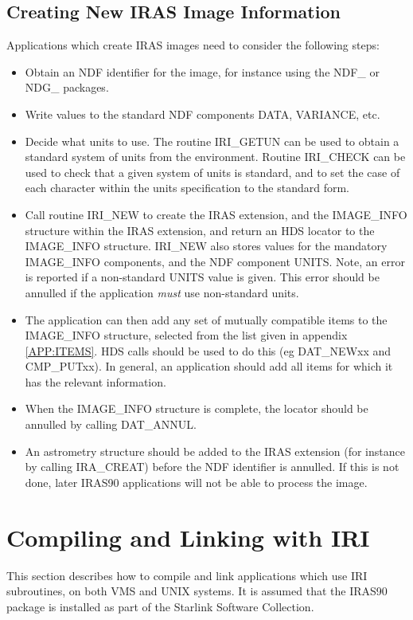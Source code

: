 \subsection{Creating New IRAS Image Information}
Applications which create IRAS images need to consider the following
steps:
\begin{itemize}

\item Obtain an NDF identifier for the image, for instance using the NDF\_ or
NDG\_ packages.

\item Write values to the standard NDF components DATA, VARIANCE, etc.

\item Decide what units to use. The routine IRI\_GETUN can be used to obtain a
standard system of units from the environment. Routine IRI\_CHECK can be used to
check that a given system of units is standard, and to set the case of each
character within the units specification to the standard form.

\item Call routine IRI\_NEW to create the IRAS extension, and the IMAGE\_INFO
structure within the IRAS extension, and return an HDS locator to the
IMAGE\_INFO structure. IRI\_NEW also stores values for the mandatory IMAGE\_INFO
components, and the NDF component UNITS. Note, an error is reported if a
non-standard UNITS value is given. This error should be annulled if the
application {\em must} use non-standard units.

\item The application can then add any set of mutually compatible
items to the IMAGE\_INFO structure, selected from the list given in appendix
\ref{APP:ITEMS}. HDS calls should be used to do this (eg DAT\_NEWxx and
CMP\_PUTxx). In general, an application should add all items for which it has
the relevant information.

\item When the IMAGE\_INFO structure is complete, the
locator should be annulled by calling DAT\_ANNUL.

\item An astrometry structure should be added to the IRAS extension (for
instance by calling IRA\_CREAT) before the NDF identifier is annulled. If this
is not done, later IRAS90 applications will not be able to process the image.

\end{itemize}

\section {Compiling and Linking with IRI}
\label{SEC:LINK}
This section describes how to compile and link applications which use IRI
subroutines, on both VMS and UNIX systems. It is assumed that the IRAS90 package
is installed as part of the Starlink Software Collection.

